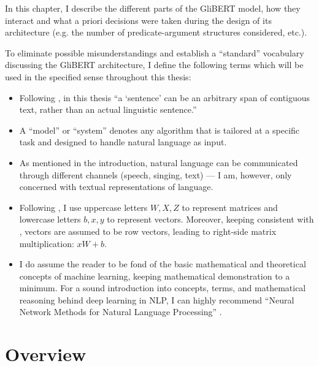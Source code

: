 
\label{chap:4_architecture}

In this chapter, I describe the different parts of the GliBERT model, how they
interact and what a priori decisions were taken during the design of its architecture
(e.g. the number of predicate-argument structures considered, etc.).

To eliminate possible misunderstandings and establish a ``standard'' vocabulary discussing the GliBERT
architecture, I define the following terms which will be used in the specified sense throughout
this thesis:

\begin{itemize}
  \item Following \cite{devlin2018bert}, in this thesis ``a `sentence' can be an arbitrary span of contiguous text, rather
    than an actual linguistic sentence.''
  \item A ``model'' or ``system'' denotes any algorithm that is tailored at a specific task and designed
    to handle natural language as input.
  \item As mentioned in the introduction, natural language can be communicated through different channels (speech, singing, text)
    --- I am, however, only concerned with textual representations of language.
  \item Following \cite{goldberg2017neural}, I use uppercase letters $W, X, Z$ to represent matrices and lowercase
    letters $b, x, y$ to represent vectors. Moreover, keeping consistent with \citeauthor{goldberg2017neural},
    vectors are assumed to be row vectors, leading to right-side matrix multiplication: $xW + b$.
  \item I do assume the reader to be fond of the basic mathematical and theoretical concepts of machine learning,
    keeping mathematical demonstration to a minimum. For a sound introduction into concepts, terms, and mathematical
    reasoning behind deep learning in NLP, I can highly recommend ``Neural Network Methods for Natural Language Processing'' \citep{goldberg2017neural}.
\end{itemize}



\section{Overview}

